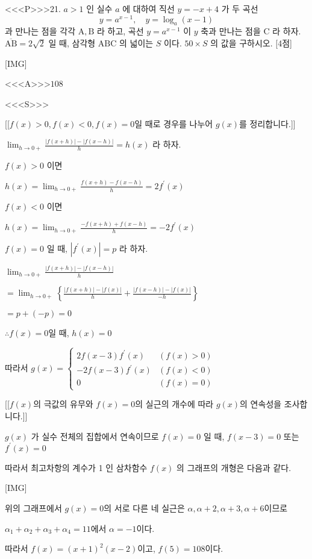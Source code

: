 \documentclass{oblivoir}
\begin{document}
<<<P>>>21. $a>1$ 인 실수 $a$ 에 대하여 직선 $y=-x+4$ 가 두 곡선
$$
y=a^{x-1}, \quad y=\log _{a}(x-1)
$$
과 만나는 점을 각각 $\mathrm{A}, \mathrm{B}$ 라 하고, 곡선 $y=a^{x-1}$ 이 $y$ 축과 만나는 점을 $\mathrm{C}$ 라 하자. $\overline{\mathrm{AB}}=2 \sqrt{2}$ 일 때, 삼각형 $\mathrm{ABC}$ 의 넓이는 $S$ 이다. $50 \times S$ 의 값을 구하시오. [4점]

[IMG]

<<<A>>>$108$

<<<S>>>

[[$f(x)>0,f(x)<0,f(x)=0$일 때로 경우를 나누어 $g(x)$를 정리합니다.]]

$ \lim _{h \rightarrow 0+} \frac{|f(x+h)|-|f(x-h)|}{h}=h(x)$ 라 하자.

$f(x)>0$ 이면

$h(x)=\lim _{h \rightarrow 0+} \frac{f(x+h)-f(x-h)}{h}=2 f^{\prime}(x)$

$f(x)<0 $ 이면

$h(x)=\lim _{h \rightarrow 0+} \frac{-f(x+h)+f(x-h)}{h}=-2 f^{\prime}(x)$

$f(x)=0 $ 일 때, $\left|f^{\prime}(x)\right|=p $ 라 하자.

$\lim _{h \rightarrow 0+} \frac{|f(x+h)|-|f(x-h)|}{h}$

$=\lim _{h \rightarrow 0+}\left\{\frac{|f(x+h)|-|f(x)|}{h} + \frac{|f(x-h)|-|f(x)|}{-h}\right\}$

$=p+(-p)=0$

$\therefore f(x)=0$일 때, $h(x)=0$

따라서 $g(x)=\begin{cases}
2 f(x-3) f^{\prime}(x) & (f(x)>0) \\
-2 f(x-3) f^{\prime}(x) & (f(x)<0) \\
0 & (f(x)=0)
\end{cases}$

[[$f(x)$의 극값의 유무와 $f(x)=0$의 실근의 개수에 따라 $g(x)$의 연속성을 조사합니다.]]

$g(x)$ 가 실수 전체의 집합에서 연속이므로
$f(x)=0$ 일 때, $f(x-3)=0$ 또는 $f^{\prime}(x)=0$

따라서 최고차항의 계수가 1 인 삼차함수 $f(x)$ 의 그래프의 개형은 다음과 같다.

[IMG]

위의 그래프에서 $g(x)=0$의 서로 다른 네 실근은 $\alpha, \alpha+2, \alpha+3, \alpha+6$이므로

$\alpha_{1}+\alpha_{2}+\alpha_{3}+\alpha_{4}=11$에서 $\alpha=-1$이다.

따라서 $f(x)=(x+1)^2 (x-2)$이고, $f(5)=108$이다.
\end{document}
